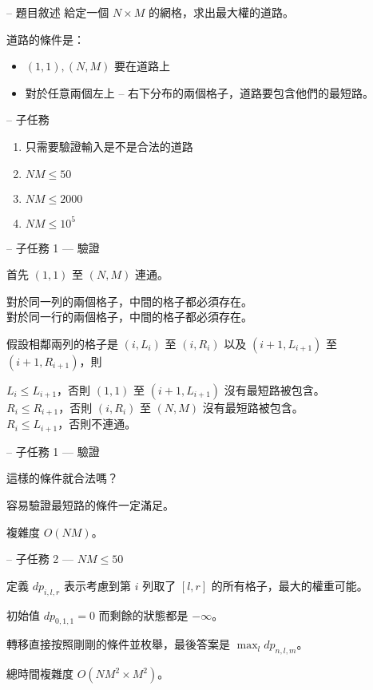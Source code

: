 \documentclass[hyperref,UTF8,notheorems,xcolor={dvipsnames}]{beamer}
\newcommand{\btitle}[1]{{\secname} -- #1}
\theoremstyle{definition}
\begin{document}
\begin{frame}[fragile]{\btitle{題目敘述}}
	給定一個 $N \times M$ 的網格，求出最大權的道路。  

	道路的條件是：
	\begin{itemize}
		\item $(1, 1), (N, M)$ 要在道路上
		\item 對於任意兩個左上 -- 右下分布的兩個格子，道路要包含他們的最短路。
	\end{itemize}
\end{frame}

\begin{frame}[fragile]{\btitle{子任務}}
	\begin{enumerate}
		\item 只需要驗證輸入是不是合法的道路
		\item $NM \leq 50$
		\item $NM \leq 2000$
		\item $NM \leq 10^5$
	\end{enumerate}
\end{frame}

\begin{frame}[fragile]{\btitle{子任務 1 --- 驗證}}
	
	首先 $(1, 1)$ 至 $(N, M)$ 連通。  

	{
		對於同一列的兩個格子，中間的格子都必須存在。\\  
		對於同一行的兩個格子，中間的格子都必須存在。  
	}

	{
		假設相鄰兩列的格子是 $(i, L_i)$ 至 $(i, R_i)$ 以及 $(i+1, L_{i+1})$ 至 $(i+1, R_{i+1})$，則  

		$L_i \leq L_{i+1}$，否則 $(1, 1)$ 至 $(i+1, L_{i+1})$ 沒有最短路被包含。\\
		$R_i \leq R_{i+1}$，否則 $(i, R_i)$ 至 $(N, M)$ 沒有最短路被包含。\\
		$R_i \leq L_{i+1}$，否則不連通。
	}

\end{frame}

\begin{frame}[fragile]{\btitle{子任務 1 --- 驗證}}
	
	這樣的條件就合法嗎？  

	容易驗證最短路的條件一定滿足。  

	複雜度 $O(NM)$。  

\end{frame}

\begin{frame}[fragile]{\btitle{子任務 2 --- $NM \leq 50$}}
	
	定義 $dp_{i, l, r}$ 表示考慮到第 $i$ 列取了 $[l, r]$ 的所有格子，最大的權重可能。  

	初始值 $dp_{0, 1, 1} = 0$ 而剩餘的狀態都是 $- \infty$。  

	轉移直接按照剛剛的條件並枚舉，最後答案是 $\max_{l} dp_{n,l,m}$。  

	總時間複雜度 $O(NM^2 \times M^2)$。  

\end{frame}
\end{document}

